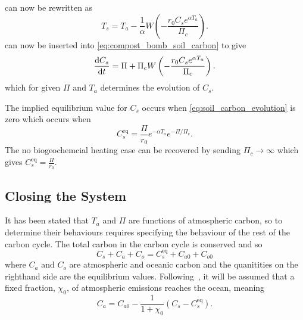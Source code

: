  can now be rewritten as
\begin{equation}
  \label{eq:soil_temperature_equilibrium_nppc}
  T_s = T_a - \frac{1}{\alpha} W\left(-\frac{r_0C_s e^{\alpha T_a}}{\Pi_c} \right).
\end{equation}
 can now be inserted into \cref{eq:compost_bomb_soil_carbon} to give
\begin{equation}
  \label{eq:soil_carbon_evolution}
  \dv{C_s}{t} = \Pi + \Pi_c W\left(-\frac{r_0C_s e^{\alpha T_a}}{\Pi_c} \right).
\end{equation}
which for given $\Pi$ and $T_a$ determines the evolution of $C_s$.

The implied equilibrium value for $C_s$ occurs when \cref{eq:soil_carbon_evolution} is zero which occurs when
\begin{equation}
  \label{eq:equilibrium_soil_carbon}
  C_s^{\mathrm{eq}} = \frac{\Pi}{r_0} e^{-\alpha T_a} e^{-\Pi/\Pi_c}.
\end{equation}
The no biogeochemcial heating case can be recovered by sending $\Pi_c \rightarrow \infty$ which gives $C_s^{\mathrm{eq}} = \frac{\Pi}{r_0}$.

\subsection{Closing the System}
It has been stated that $T_a$ and $\Pi$ are functions of atmospheric carbon, so to determine their behaviours requires specifying the behaviour of the rest of the carbon
cycle. The total carbon in the carbon cycle is conserved and so
\begin{equation}
  \label{eq:carbon_conservation}
  C_s + C_a + C_o = C_s^{\mathrm{eq}} + C_{a0} + C_{o0}
\end{equation}
where $C_a$ and $C_o$ are atmospheric and oceanic carbon and the quanitities on the righthand side are the equilibrium values.
Following~\cite{Cox2006}, it will be assumed that a fixed fraction, $\chi_0$, of atmospheric emissions reaches the ocean, meaning
\begin{equation}
  \label{eq:simple_ocean}
  C_a = C_{a0} -\frac{1}{1+\chi_0} (C_s - C_{s}^{\mathrm{eq}}).
\end{equation}


